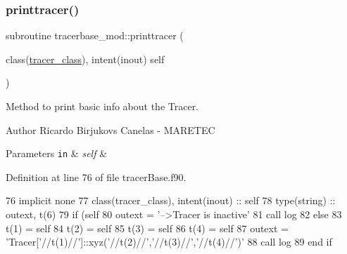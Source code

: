 \mbox{\label{namespacetracerbase__mod_ae320123e374df674769dbd48ba5ef46f}} 
\subsubsection{\texorpdfstring{printtracer()}{printtracer()}}
{\footnotesize\ttfamily subroutine tracerbase\+\_\+mod\+::printtracer (\begin{DoxyParamCaption}\item[{class(\mbox{\hyperlink{structtracerbase__mod_1_1tracer__class}{tracer\+\_\+class}}), intent(inout)}]{self }\end{DoxyParamCaption})\hspace{0.3cm}{\ttfamily [private]}}



Method to print basic info about the Tracer. 

\begin{DoxyAuthor}{Author}
Ricardo Birjukovs Canelas -\/ M\+A\+R\+E\+T\+EC 
\end{DoxyAuthor}

\begin{DoxyParams}[1]{Parameters}
\mbox{\tt in}  & {\em self} & \\
\hline
\end{DoxyParams}


Definition at line 76 of file tracer\+Base.\+f90.


\begin{DoxyCode}
76     \textcolor{keywordtype}{implicit none}
77     \textcolor{keywordtype}{class}(tracer\_class), \textcolor{keywordtype}{intent(inout)} :: self
78     \textcolor{keywordtype}{type}(string) :: outext, t(6)
79     \textcolor{keywordflow}{if} (self%
80         outext = \textcolor{stringliteral}{'-->Tracer is inactive'}
81         \textcolor{keyword}{call }log%
82     \textcolor{keywordflow}{else}
83         t(1) = self%
84         t(2) = self%
85         t(3) = self%
86         t(4) = self%
87         outext = \textcolor{stringliteral}{'Tracer['}//t(1)//\textcolor{stringliteral}{']::xyz('}//t(2)//\textcolor{stringliteral}{','}//t(3)//\textcolor{stringliteral}{','}//t(4)//\textcolor{stringliteral}{')'}
88         \textcolor{keyword}{call }log%
89 \textcolor{keywordflow}{    end if}
\end{DoxyCode}
